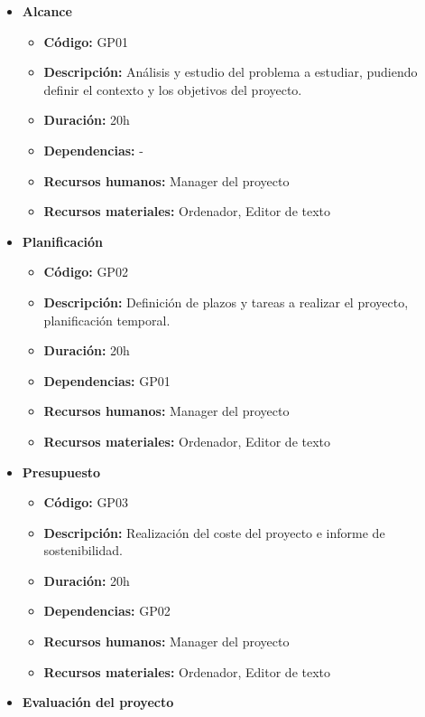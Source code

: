 
\begin{itemize}
    \item \textbf{Alcance}
        \begin{itemize}
            \item \textbf{Código:} GP01
            \item \textbf{Descripción:} Análisis y estudio del problema a estudiar, pudiendo definir el contexto y los objetivos del proyecto.
            \item \textbf{Duración:} 20h
            \item \textbf{Dependencias:} -
            \item \textbf{Recursos humanos:} Manager del proyecto
            \item \textbf{Recursos materiales:} Ordenador, Editor de texto
        \end{itemize}
    \item \textbf{Planificación}
        \begin{itemize}
            \item \textbf{Código:} GP02
            \item \textbf{Descripción:} Definición de plazos y tareas a realizar el proyecto, planificación temporal.
            \item \textbf{Duración:} 20h
            \item \textbf{Dependencias:} GP01
            \item \textbf{Recursos humanos:} Manager del proyecto
            \item \textbf{Recursos materiales:} Ordenador, Editor de texto
        \end{itemize}
    \item \textbf{Presupuesto}
        \begin{itemize}
            \item \textbf{Código:} GP03
            \item \textbf{Descripción:} Realización del coste del proyecto e informe de sostenibilidad.
            \item \textbf{Duración:} 20h
            \item \textbf{Dependencias:} GP02
            \item \textbf{Recursos humanos:} Manager del proyecto
            \item \textbf{Recursos materiales:} Ordenador, Editor de texto
        \end{itemize}
    \item \textbf{Evaluación del proyecto}

\end{itemize}
